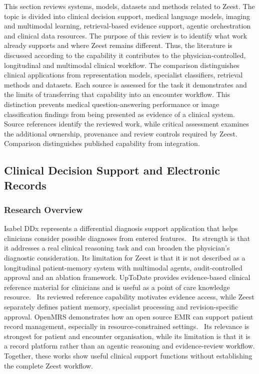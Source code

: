 This section reviews systems, models, datasets and methods related to Zeest. The topic is divided into clinical decision support, medical language models, imaging and multimodal learning, retrieval-based evidence support, agentic orchestration and clinical data resources. The purpose of this review is to identify what work already supports and where Zeest remains different. Thus, the literature is discussed according to the capability it contributes to the physician-controlled, longitudinal and multimodal clinical workflow. The comparison distinguishes clinical applications from representation models, specialist classifiers, retrieval methods and datasets. Each source is assessed for the task it demonstrates and the limits of transferring that capability into an encounter workflow. This distinction prevents medical question-answering performance or image classification findings from being presented as evidence of a clinical system. Source references identify the reviewed work, while critical assessment examines the additional ownership, provenance and review controls required by Zeest. Comparison distinguishes published capability from integration.

\subsection{Clinical Decision Support and Electronic Records}
\subsubsection{Research Overview}

Isabel DDx represents a differential diagnosis support application that helps clinicians consider possible diagnoses from entered features.~\cite{zeestB:isabel} Its strength is that it addresses a real clinical reasoning task and can broaden the physician's diagnostic consideration. Its limitation for Zeest is that it is not described as a longitudinal patient-memory system with multimodal agents, audit-controlled approval and an ablation framework. UpToDate provides evidence-based clinical reference material for clinicians and is useful as a point of care knowledge resource.~\cite{zeestB:uptodate} Its reviewed reference capability motivates evidence access, while Zeest separately defines patient memory, specialist processing and revision-specific approval. OpenMRS demonstrates how an open source EMR can support patient record management, especially in resource-constrained settings.~\cite{zeestB:openmrs} Its relevance is strongest for patient and encounter organisation, while its limitation is that it is a record platform rather than an agentic reasoning and evidence-review workflow. Together, these works show useful clinical support functions without establishing the complete Zeest workflow.

